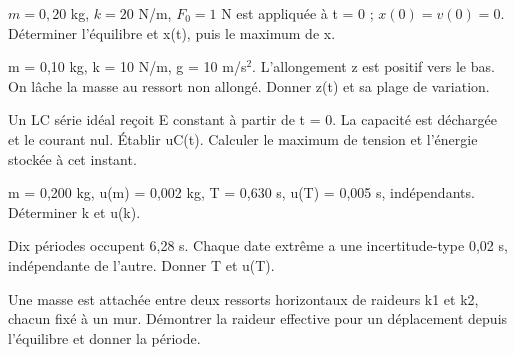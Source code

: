 \begin{questions}
\item $m=0{,}20$ kg, $k=20$ N/m, $F_0=1$ N est appliquée à t = 0 ; $x(0)=v(0)=0$. Déterminer l’équilibre et x(t), puis le maximum de x.
\end{questions}

\begin{questions}
\item m = 0,10 kg, k = 10 N/m, g = 10 m/s$^2$. L’allongement z est positif vers le bas. On lâche la masse au ressort non allongé. Donner z(t) et sa plage de variation.
\end{questions}

\begin{questions}
\item Un LC série idéal reçoit E constant à partir de t = 0. La capacité est déchargée et le courant nul. Établir uC(t). Calculer le maximum de tension et l’énergie stockée à cet instant.
\end{questions}



\begin{questions}
\item m = 0,200 kg, u(m) = 0,002 kg, T = 0,630 s, u(T) = 0,005 s, indépendants. Déterminer k et u(k).
\end{questions}

\begin{questions}
\item Dix périodes occupent 6,28 s. Chaque date extrême a une incertitude-type 0,02 s, indépendante de l’autre. Donner T et u(T).
\end{questions}

\begin{questions}
\item Une masse est attachée entre deux ressorts horizontaux de raideurs k1 et k2, chacun fixé à un mur. Démontrer la raideur effective pour un déplacement depuis l’équilibre et donner la période.
\end{questions}



